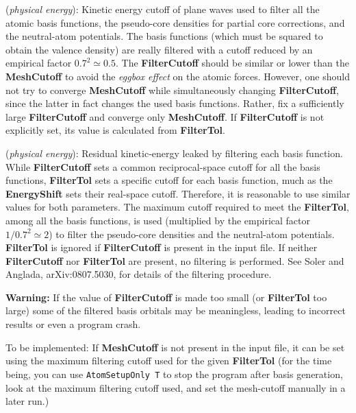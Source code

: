 \begin{description}
\itemsep 10pt
\parsep 0pt

\item[\textbf{FilterCutoff}] (\textit{physical energy}):
Kinetic energy cutoff of plane waves used to filter all the
atomic basis functions, the pseudo-core densities
for partial core corrections, and the neutral-atom potentials.
The basis functions (which must be squared to obtain the
valence density) are really filtered with a cutoff reduced by an
empirical factor $0.7^2 \simeq 0.5$. The \textbf{FilterCutoff} should
be similar or lower than the \textbf{MeshCutoff} to avoid the
\textit{eggbox effect} on the atomic forces.
However, one should
not try to converge \textbf{MeshCutoff} while simultaneously
changing \textbf{FilterCutoff}, since the latter in fact changes
the used basis functions. Rather, fix a sufficiently large
\textbf{FilterCutoff} and converge only \textbf{MeshCutoff}.
If \textbf{FilterCutoff} is not explicitly set, its value is
calculated from \textbf{FilterTol}.

\item[\textbf{FilterTol}] (\textit{physical energy}):
Residual kinetic-energy leaked by filtering each basis function.
While \textbf{FilterCutoff} sets a common reciprocal-space cutoff
for all the basis functions, \textbf{FilterTol} sets a specific 
cutoff for each basis function, much as the \textbf{EnergyShift}
sets their real-space cutoff. Therefore,
it is reasonable to use similar values for both parameters.
The maximum cutoff required to meet the \textbf{FilterTol},
among all the basis functions, is used (multiplied by the
empirical factor $1/0.7^2 \simeq 2$) to filter the pseudo-core
densities and the neutral-atom potentials. \textbf{FilterTol} is ignored if
\textbf{FilterCutoff} is present in the input file.
If neither \textbf{FilterCutoff} nor \textbf{FilterTol} are
present, no filtering is performed.
See Soler and Anglada, arXiv:0807.5030, for details of the
filtering procedure.

\textbf{Warning:} If the value of \textbf{FilterCutoff} is
made too small (or \textbf{FilterTol} too large) some of
the filtered basis orbitals may be meaningless, leading to
incorrect results or even a program crash.

To be implemented: If \textbf{MeshCutoff} is not present in the input
file, it can be set using the maximum filtering cutoff used for the given 
\textbf{FilterTol} (for the time being, you can use \texttt{AtomSetupOnly T} 
to stop the program after basis generation, look at the maximum filtering
cutoff used, and set the mesh-cutoff manually in a later run.)

\end{description}

